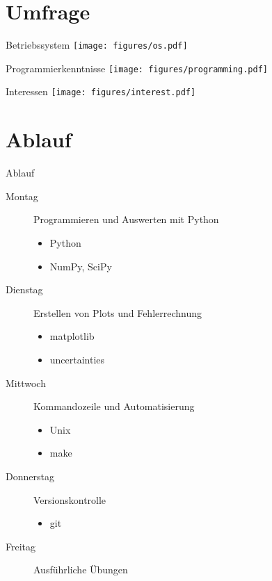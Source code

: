 \section{Umfrage}


\begin{frame}{Betriebssystem}
  \centering
  \texttt{[image: figures/os.pdf]}
\end{frame}

\begin{frame}{Programmierkenntnisse}
  \centering
  \texttt{[image: figures/programming.pdf]}
\end{frame}

\begin{frame}{Interessen}
  \centering
  \texttt{[image: figures/interest.pdf]}
\end{frame}

\section{Ablauf}

\begin{frame}{Ablauf}
  \begin{description}
    \item[Montag] Programmieren und Auswerten mit Python
      \begin{itemize}
        \item Python
        \item NumPy, SciPy
      \end{itemize}
    \item[Dienstag] Erstellen von Plots und Fehlerrechnung
      \begin{itemize}
        \item matplotlib
        \item uncertainties
      \end{itemize}
    \item[Mittwoch] Kommandozeile und Automatisierung
      \begin{itemize}
        \item Unix
        \item make
      \end{itemize}
    \item[Donnerstag] Versionskontrolle
      \begin{itemize}
        \item git
      \end{itemize}
    \item[Freitag] Ausführliche Übungen
  \end{description}
\end{frame}
